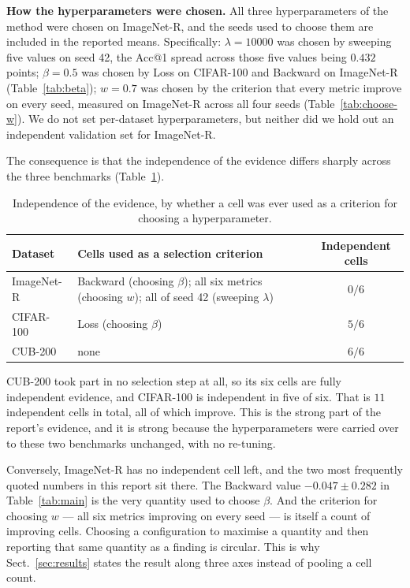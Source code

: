 \documentclass[11pt,a4paper]{article}
\begin{document}
\textbf{How the hyperparameters were chosen.} All three hyperparameters of the
method were chosen on ImageNet-R, and the seeds used to choose them are included
in the reported means. Specifically: $\lambda = 10000$ was chosen by sweeping
five values on seed 42, the Acc@1 spread across those five values being $0.432$
points; $\beta = 0.5$ was chosen by Loss on CIFAR-100 and Backward on ImageNet-R
(Table~\ref{tab:beta}); $w = 0.7$ was chosen by the criterion that every metric
improve on every seed, measured on ImageNet-R across all four seeds
(Table~\ref{tab:choose-w}). We do not set per-dataset hyperparameters, but
neither did we hold out an independent validation set for ImageNet-R.

The consequence is that the independence of the evidence differs sharply across
the three benchmarks (Table~\ref{tab:tuning-scope}).

\begin{table}[htbp]
\centering
\caption{Independence of the evidence, by whether a cell was ever used as a
criterion for choosing a hyperparameter.}
\label{tab:tuning-scope}
\begin{tabular}{@{}lp{6.4cm}c@{}}
\toprule
Dataset & Cells used as a selection criterion & Independent cells \\
\midrule
ImageNet-R & Backward (choosing $\beta$); all six metrics (choosing $w$); all of
             seed 42 (sweeping $\lambda$) & $0/6$ \\
CIFAR-100  & Loss (choosing $\beta$) & $5/6$ \\
CUB-200    & none & $6/6$ \\
\bottomrule
\end{tabular}
\end{table}

CUB-200 took part in no selection step at all, so its six cells are fully
independent evidence, and CIFAR-100 is independent in five of six. That is $11$
independent cells in total, all of which improve. This is the strong part of the
report's evidence, and it is strong because the hyperparameters were carried over
to these two benchmarks unchanged, with no re-tuning.

Conversely, ImageNet-R has no independent cell left, and the two most frequently
quoted numbers in this report sit there. The Backward value $-0.047 \pm 0.282$
in Table~\ref{tab:main} is the very quantity used to choose $\beta$. And the
criterion for choosing $w$ --- all six metrics improving on every seed --- is
itself a count of improving cells. Choosing a configuration to maximise a
quantity and then reporting that same quantity as a finding is circular. This is
why Sect.~\ref{sec:results} states the result along three axes instead of
pooling a cell count.
\end{document}
